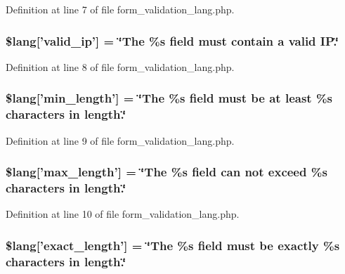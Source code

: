 Definition at line 7 of file form\-\_\-validation\-\_\-lang.\-php.

\subsubsection[{\$lang}]{\setlength{\rightskip}{0pt plus 5cm}\$lang['valid\-\_\-ip'] = \char`\"{}The \%{\bf s} field must contain {\bf a} valid I\-P.\char`\"{}}\label{form__validation__lang_8php_ad153ba0f29eaf9bbdb529c2f03f29751}


Definition at line 8 of file form\-\_\-validation\-\_\-lang.\-php.

\subsubsection[{\$lang}]{\setlength{\rightskip}{0pt plus 5cm}\$lang['min\-\_\-length'] = \char`\"{}The \%{\bf s} field must be at least \%{\bf s} characters in length.\char`\"{}}\label{form__validation__lang_8php_a64646d89fb51eebd0b5bea81fd17eb1f}


Definition at line 9 of file form\-\_\-validation\-\_\-lang.\-php.

\subsubsection[{\$lang}]{\setlength{\rightskip}{0pt plus 5cm}\$lang['max\-\_\-length'] = \char`\"{}The \%{\bf s} field can {\bf not} exceed \%{\bf s} characters in length.\char`\"{}}\label{form__validation__lang_8php_a813327453a2d63855f7d6f84c9b58d49}


Definition at line 10 of file form\-\_\-validation\-\_\-lang.\-php.

\subsubsection[{\$lang}]{\setlength{\rightskip}{0pt plus 5cm}\$lang['exact\-\_\-length'] = \char`\"{}The \%{\bf s} field must be exactly \%{\bf s} characters in length.\char`\"{}}\label{form__validation__lang_8php_af951a7ce2f4a4afd7da33e7fac480175}


